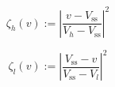 \begin{equation}
	\zeta_h(v) := \left|\frac{v-V_\text{ss}}{V_h-V_\text{ss}}\right|^{2}
	\label{ch1:equ:high-voltage-threshold-cost-simple}
\end{equation}

\begin{equation}
	\zeta_l(v) := \left|\frac{V_\text{ss}-v}{V_\text{ss}-V_l}\right|^{2}
	\label{ch1:equ:low-voltage-threshold-cost-simple}
\end{equation}
